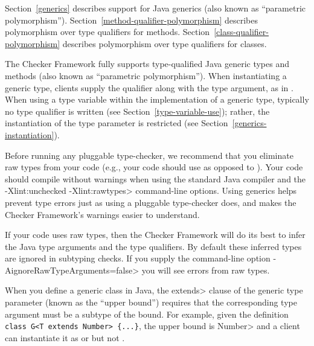 \htmlhr
{}

Section~\ref{generics} describes support for Java generics (also known as
``parametric polymorphism'').
Section~\ref{method-qualifier-polymorphism} describes polymorphism over
type qualifiers for methods. Section~\ref{class-qualifier-polymorphism} describes
polymorphism over type qualifiers for classes.



The Checker Framework fully supports
type-qualified Java generic types and methods (also known as ``parametric
polymorphism'').
When instantiating a generic type,
clients supply the qualifier along with the type argument, as in
.
When using a type variable  within the implementation of a generic type,
typically no type qualifier is written (see Section~\ref{type-variable-use});
rather, the instantiation of the type parameter is restricted (see
Section~\ref{generics-instantiation}).



Before running any pluggable type-checker, we recommend that you eliminate
raw types from your code (e.g., your code should use  as
opposed to ).
Your code should compile without warnings when using the standard Java
compiler and the \<-Xlint:unchecked -Xlint:rawtypes> command-line options.
Using generics helps prevent type errors just as using a pluggable
type-checker does, and makes the Checker Framework's warnings easier to
understand.

If your code uses raw types, then the Checker Framework will do its best to
infer the Java type arguments and the type qualifiers.  By default these
inferred types are ignored in subtyping checks. If you supply the
command-line option \<-AignoreRawTypeArguments=false> you will see errors
from raw types.



When you define a generic class in Java, the \<extends> clause
of the generic type parameter (known as the ``upper bound'') requires that
the corresponding type argument must be a subtype of the bound.
For example, given the definition
\verb|class G<T extends Number> {...}|,
the upper bound is \<Number>
and a client can instantiate it as  or 
but not .

